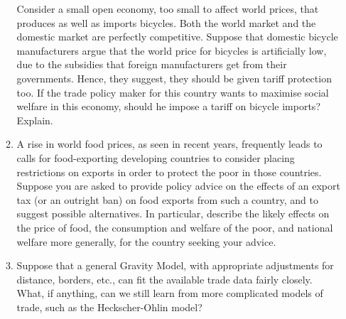 \documentclass[12pt,onesided]{article}
\begin{document}
\begin{enumerate}
\begin{enumerate}
		Consider a small open economy, too small to affect world prices, that produces as well as imports bicycles. Both the world market and the domestic market are perfectly competitive. Suppose that domestic bicycle manufacturers argue that the world price for bicycles is artificially low, due to the subsidies that foreign manufacturers get from their governments. Hence, they suggest, they should be given tariff protection too. If the trade policy maker for this country wants to maximise social welfare in this economy, should he impose a tariff on bicycle imports? Explain. 
		\item A rise in world food prices, as seen in recent years, frequently leads to calls for food-exporting developing countries to consider placing restrictions on exports in order to protect the poor in those countries. Suppose you are asked to provide policy advice on the effects of an export tax (or an outright ban) on food exports from such a country, and to suggest possible alternatives. In particular, describe the likely effects on the price of food, the consumption and welfare of the poor, and national welfare more generally, for the country seeking your advice. 
		\item Suppose that a general Gravity Model, with appropriate adjustments for distance, borders, etc., can fit the available trade data fairly closely. What, if anything, can we still learn from more complicated models of trade, such as the Heckscher-Ohlin model? 
	\end{enumerate}

\end{enumerate}
\end{document}
